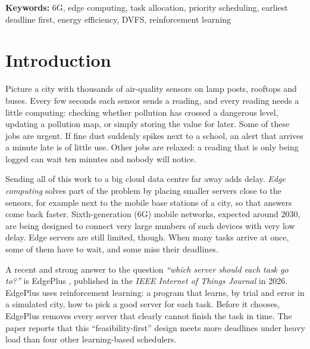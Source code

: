\documentclass[11pt]{article}
\theoremstyle{definition}
\begin{document}
\noindent\textbf{Keywords:} 6G, edge computing, task allocation, priority scheduling, earliest deadline first, energy efficiency, DVFS, reinforcement learning

\vspace{8pt}

\section{Introduction}

Picture a city with thousands of air-quality sensors on lamp posts, rooftops and buses. Every few seconds each
sensor sends a reading, and every reading needs a little computing: checking whether pollution has crossed a
dangerous level, updating a pollution map, or simply storing the value for later. Some of these jobs are urgent.
If fine dust suddenly spikes next to a school, an alert that arrives a minute late is of little use. Other jobs
are relaxed: a reading that is only being logged can wait ten minutes and nobody will notice.

Sending all of this work to a big cloud data centre far away adds delay. \emph{Edge computing} solves part of the
problem by placing smaller servers close to the sensors, for example next to the mobile base stations of a
city, so that answers come back faster. Sixth-generation (6G) mobile networks, expected around 2030, are being
designed to connect very large numbers of such devices with very low delay. Edge servers are still limited,
though. When many tasks arrive at once, some of them have to wait, and some miss their deadlines.

A recent and strong answer to the question \emph{``which server should each task go to?''} is EdgePlus
\cite{edgeplus2026}, published in the \emph{IEEE Internet of Things Journal} in 2026. EdgePlus uses
reinforcement learning: a program that learns, by trial and error in a simulated city, how to pick a good
server for each task. Before it chooses, EdgePlus removes every server that clearly cannot finish the task in
time. The paper reports that this ``feasibility-first'' design meets more deadlines under heavy load than four
other learning-based schedulers.
\end{document}
